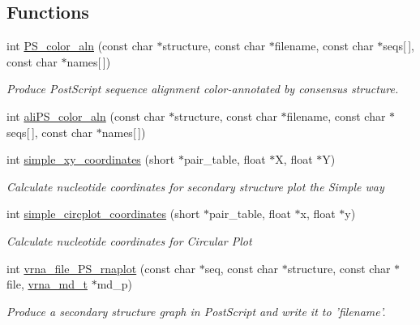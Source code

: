 \subsection*{Functions}
\begin{DoxyCompactItemize}
\item 
\hypertarget{group__plotting__utils_ga821802c3685e37e15182341f6217470d}{int \hyperlink{group__plotting__utils_ga821802c3685e37e15182341f6217470d}{P\-S\-\_\-color\-\_\-aln} (const char $\ast$structure, const char $\ast$filename, const char $\ast$seqs\mbox{[}$\,$\mbox{]}, const char $\ast$names\mbox{[}$\,$\mbox{]})}\label{group__plotting__utils_ga821802c3685e37e15182341f6217470d}

\begin{DoxyCompactList}\small\item\em Produce Post\-Script sequence alignment color-\/annotated by consensus structure. \end{DoxyCompactList}\item 
int \hyperlink{group__plotting__utils_gaab48d4dac655d688abe921389ac2847c}{ali\-P\-S\-\_\-color\-\_\-aln} (const char $\ast$structure, const char $\ast$filename, const char $\ast$seqs\mbox{[}$\,$\mbox{]}, const char $\ast$names\mbox{[}$\,$\mbox{]})
\item 
int \hyperlink{group__plotting__utils_gaf4b9173e7d3fd361c3c85e6def194123}{simple\-\_\-xy\-\_\-coordinates} (short $\ast$pair\-\_\-table, float $\ast$X, float $\ast$Y)
\begin{DoxyCompactList}\small\item\em Calculate nucleotide coordinates for secondary structure plot the {\itshape Simple way} \end{DoxyCompactList}\item 
int \hyperlink{group__plotting__utils_gac4ea13d35308f09940178d2b05a248c2}{simple\-\_\-circplot\-\_\-coordinates} (short $\ast$pair\-\_\-table, float $\ast$x, float $\ast$y)
\begin{DoxyCompactList}\small\item\em Calculate nucleotide coordinates for {\itshape Circular Plot} \end{DoxyCompactList}\item 
int \hyperlink{group__plotting__utils_gabdc8f6548ba4a3bc3cd868ccbcfdb86a}{vrna\-\_\-file\-\_\-\-P\-S\-\_\-rnaplot} (const char $\ast$seq, const char $\ast$structure, const char $\ast$file, \hyperlink{group__model__details_ga1f8a10e12a0a1915f2a4eff0b28ea17c}{vrna\-\_\-md\-\_\-t} $\ast$md\-\_\-p)
\begin{DoxyCompactList}\small\item\em Produce a secondary structure graph in Post\-Script and write it to 'filename'. \end{DoxyCompactList}\item 

\end{DoxyCompactItemize}
